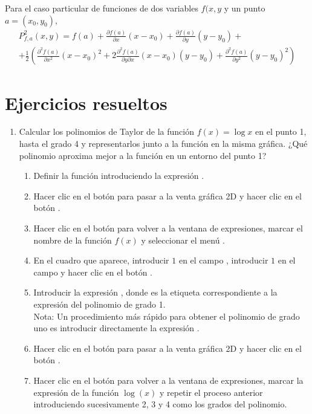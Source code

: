 Para el caso particular de funciones de dos variables $f(x,y$ y un punto $a=(x_0,y_0)$, 
\begin{multline*}
P^2_{f,a}(x,y) = f(a)+\frac{\partial f(a)}{\partial x}(x-x_0)+\frac{\partial f(a)}{\partial y}(y-y_0)+\\
+\frac{1}{2}\left(\frac{\partial^2 f(a)}{\partial x^2}(x-x_0)^2 + 2\frac{\partial^2 f(a)}{\partial y\partial x}
(x-x_0)(y-y_0) + \frac{\partial^2 f(a)}{\partial y^2}(y-y_0)^2\right)
\end{multline*}


\newpage

\section{Ejercicios resueltos}

\begin{enumerate}[leftmargin=*]
\item Calcular los polinomios de Taylor de la función $f(x)=\log x$ en el punto 1, hasta el grado 4 y representarlos junto a la función en
la misma gráfica.
¿Qué polinomio aproxima mejor a la función en un entorno del punto 1?

\begin{indicacion}
\begin{enumerate}
\item Definir la función introduciendo la expresión . 
\item Hacer clic en el botón  para pasar a la venta gráfica 2D y hacer clic en el botón
.
\item Hacer clic en el botón   para volver a la ventana de expresiones,
marcar el nombre de la función $f(x)$ y seleccionar el menú .
\item En el cuadro que aparece, introducir $1$ en el campo , introducir $1$ en el campo  y
hacer clic en el botón .
\item Introducir la expresión , donde  es la etiqueta correspondiente a la expresión
del polinomio de grado 1.\\
Nota: Un procedimiento más rápido para obtener el polinomio de grado uno es introducir directamente la expresión
.
\item Hacer clic en el botón  para pasar a la venta gráfica 2D y hacer clic en el botón
.
\item Hacer clic en el botón  para volver a la ventana de expresiones, marcar la
expresión de la función $\log(x)$ y repetir el proceso anterior introduciendo sucesivamente 2, 3 y 4 como los grados del polinomio.
\end{enumerate}
\end{indicacion}


\end{enumerate}

